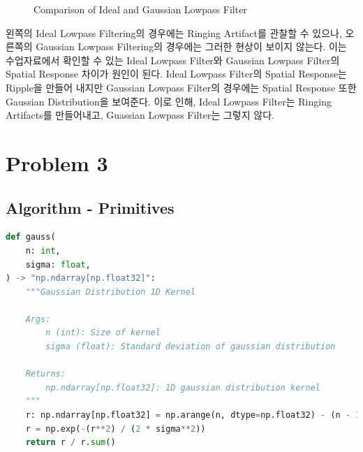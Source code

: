 \documentclass{report}
\begin{document}
\begin{figure}[htbp]
    \centering

    \hspace{1pt}

    \caption{Comparison of Ideal and Gaussian Lowpass Filter}
\end{figure}

왼쪽의 Ideal Lowpass Filtering의 경우에는 Ringing Artifact를 관찰할 수 있으나, 오른쪽의 Gaussian Lowpass Filtering의 경우에는 그러한 현상이 보이지 않는다.
이는 수업자료에서 확인할 수 있는 Ideal Lowpass Filter와 Gaussian Lowpass Filter의 Spatial Response 차이가 원인이 된다.
Ideal Lowpass Filter의 Spatial Response는 Ripple을 만들어 내지만 Gaussian Lowpass Filter의 경우에는 Spatial Response 또한 Gaussian Distribution을 보여준다.
이로 인해, Ideal Lowpass Filter는 Ringing Artifacts를 만들어내고, Guassian Lowpass Filter는 그렇지 않다.

\section*{Problem 3}

\subsection*{Algorithm - Primitives}

\begin{lstlisting}[language=Python, caption=Primitive - gauss, firstnumber=216]
def gauss(
    n: int,
    sigma: float,
) -> "np.ndarray[np.float32]":
    """Gaussian Distribution 1D Kernel

    Args:
        n (int): Size of kernel
        sigma (float): Standard deviation of gaussian distribution

    Returns:
        np.ndarray[np.float32]: 1D gaussian distribution kernel
    """
    r: np.ndarray[np.float32] = np.arange(n, dtype=np.float32) - (n - 1) / 2
    r = np.exp(-(r**2) / (2 * sigma**2))
    return r / r.sum()
\end{lstlisting}
\end{document}
